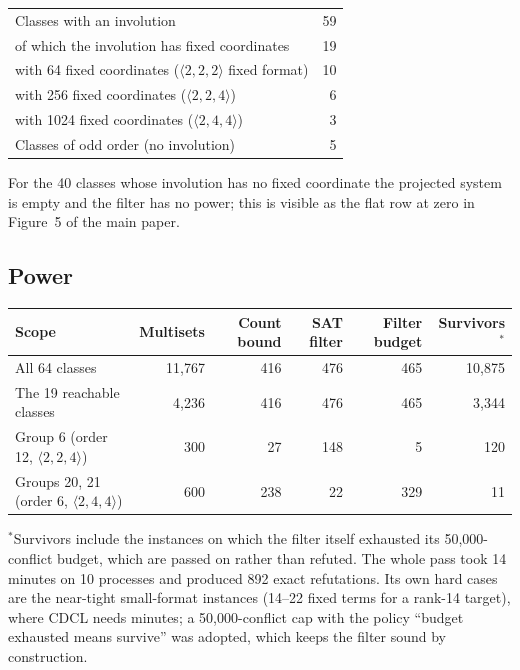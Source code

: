 \documentclass[11pt]{article}
\newcommand{\tw}[3]{\langle #1,#2,#3\rangle}
\begin{document}
\begin{center}
\begin{tabular}{lr}
\toprule
Classes with an involution & 59 \\
\quad of which the involution has fixed coordinates & 19 \\
\qquad with 64 fixed coordinates ($\tw222$ fixed format) & 10 \\
\qquad with 256 fixed coordinates ($\tw224$) & 6 \\
\qquad with 1024 fixed coordinates ($\tw244$) & 3 \\
Classes of odd order (no involution) & 5 \\
\bottomrule
\end{tabular}
\end{center}

For the 40 classes whose involution has no fixed coordinate the projected system is empty and the filter
has no power; this is visible as the flat row at zero in Figure~5 of the main paper.

\subsection{Power}

\begin{center}
\small
\begin{tabular}{lrrrrr}
\toprule
Scope & Multisets & Count bound & SAT filter & Filter budget & Survivors$^{*}$ \\
\midrule
All 64 classes & 11{,}767 & 416 & 476 & 465 & 10{,}875 \\
The 19 reachable classes & 4{,}236 & 416 & 476 & 465 & 3{,}344 \\
Group 6 (order 12, $\tw224$) & 300 & 27 & 148 & 5 & 120 \\
Groups 20, 21 (order 6, $\tw244$) & 600 & 238 & 22 & 329 & 11 \\
\bottomrule
\end{tabular}
\end{center}

$^{*}$Survivors include the instances on which the filter itself exhausted its 50{,}000-conflict budget,
which are passed on rather than refuted. The whole pass took 14 minutes on 10 processes and produced 892 exact refutations. Its own hard cases are
the near-tight small-format instances (14--22 fixed terms for a rank-14 target), where CDCL needs
minutes; a 50{,}000-conflict cap with the policy ``budget exhausted means survive'' was adopted, which
keeps the filter sound by construction.
\end{document}
